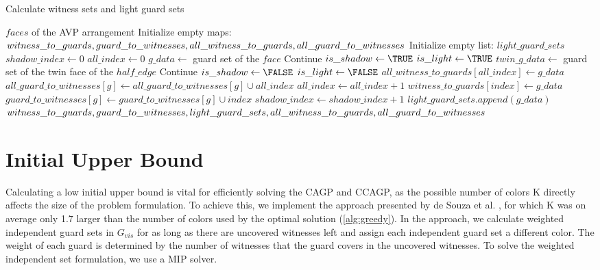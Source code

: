 \begin{algorithm}
\caption{Calculate witness sets and light guard sets}\label{alg:AVP_processing}
\begin{algorithmic}[1]
\REQUIRE $faces$ of the AVP arrangement
\STATE Initialize empty maps: $witness\_to\_guards, guard\_to\_witnesses, all\_witness\_to\_guards,\linebreak all\_guard\_to\_witnesses$
\STATE Initialize empty list: $light\_guard\_sets$
\STATE $shadow\_index\gets 0$
\STATE $all\_index\gets 0$
    \STATE $g\_data\gets$ guard set of the $face$
        \STATE Continue
    \ENDIF
    \STATE $is\_shadow\gets \TRUE$
    \STATE $is\_light\gets \TRUE$
        \STATE $twin\_g\_data\gets$ guard set of the twin face of the $half\_edge$
            \STATE Continue
        \ENDIF
            \STATE $is\_shadow\gets \FALSE$
        \ENDIF
            \STATE $is\_light\gets \FALSE$
        \ENDIF
    \ENDFOR
    \STATE $all\_witness\_to\_guards[all\_index]\gets g\_data$
        \STATE $all\_guard\_to\_witnesses[g]\gets all\_guard\_to\_witnesses[g]\cup all\_index$
    \ENDFOR
    \STATE $all\_index\gets all\_index + 1$
        \STATE $witness\_to\_guards[index]\gets g\_data$
            \STATE $guard\_to\_witnesses[g]\gets guard\_to\_witnesses[g]\cup index$
        \ENDFOR
        \STATE $shadow\_index\gets shadow\_index + 1$
    \ENDIF
        \STATE $light\_guard\_sets.append(g\_data)$
    \ENDIF
\ENDFOR
\RETURN $witness\_to\_guards, guard\_to\_witnesses, light\_guard\_sets, all\_witness\_to\_guards,\linebreak all\_guard\_to\_witnesses$
\end{algorithmic}
\end{algorithm}

\section{Initial Upper Bound}
Calculating a low initial upper bound is vital for efficiently solving the CAGP and CCAGP, as the possible number of colors K directly affects the size of the problem formulation. To achieve this, we implement the approach presented by de Souza et al. \cite{zambon2014exact}, for which K was on average only 1.7 larger than the number of colors used by the optimal solution (\cref{alg:greedy}). In the approach, we calculate weighted independent guard sets in $G_{vis}$ for as long as there are uncovered witnesses left and assign each independent guard set a different color. The weight of each guard is determined by the number of witnesses that the guard covers in the uncovered witnesses. To solve the weighted independent set formulation, we use a MIP solver.

